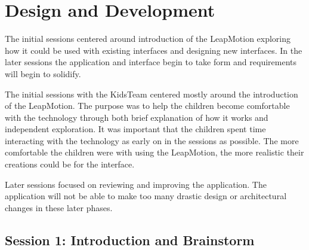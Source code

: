 
\chapter{Design and Development} %

\label{Chapter3} %





The initial sessions centered around introduction of the LeapMotion exploring how it could be used with existing interfaces and designing new interfaces. In the later sessions the application and interface begin to take form and requirements will begin to solidify. 

The initial sessions with the KidsTeam centered mostly around the introduction of the LeapMotion. The purpose was to help the children become comfortable with the technology through both brief explanation of how it works and independent exploration. It was important that the children spent time interacting with the technology as early on in the sessions as possible. The more comfortable the children were with using the LeapMotion, the more realistic their creations could be for the interface. 

Later sessions focused on reviewing and improving the application. The application will not be able to make too many drastic design or architectural changes in these later phases.
\section{Session 1: Introduction and Brainstorm}\label{session1}

